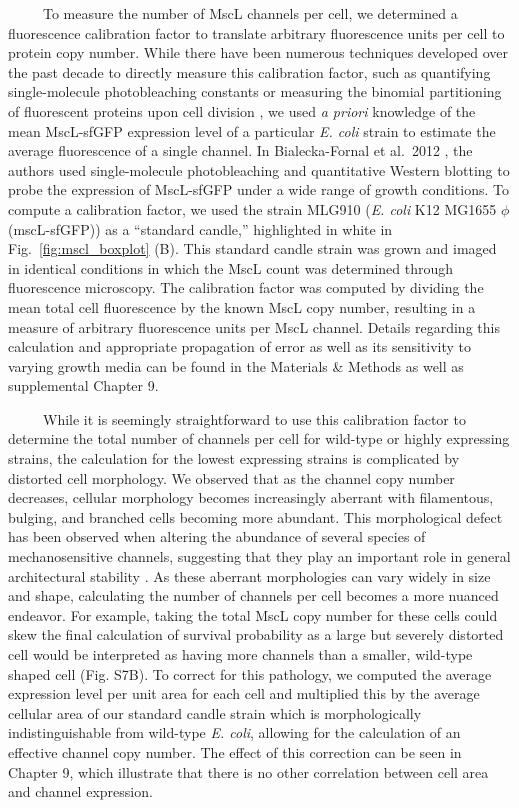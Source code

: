 \documentclass[12pt]{caltech_thesis}
\begin{document}
~~~~~To measure the number of MscL channels per cell, we determined a
fluorescence calibration factor to translate arbitrary fluorescence
units per cell to protein copy number. While there have been numerous
techniques developed over the past decade to directly measure this
calibration factor, such as quantifying single-molecule photobleaching
constants or measuring the binomial partitioning of fluorescent proteins
upon cell division \autocite{bialecka-fornal2012,elowitz2002}, we used
\emph{a priori} knowledge of the mean MscL-sfGFP expression level of a
particular \emph{E. coli} strain to estimate the average fluorescence of
a single channel. In Bialecka-Fornal et al.~2012
\autocite{bialecka-fornal2012}, the authors used single-molecule
photobleaching and quantitative Western blotting to probe the expression
of MscL-sfGFP under a wide range of growth conditions. To compute a
calibration factor, we used the strain MLG910 (\emph{E. coli} K12 MG1655
\(\phi\)(mscL-sfGFP)) as a ``standard candle,'' highlighted in white in
Fig.~\ref{fig:mscl_boxplot} (B). This standard candle strain was grown
and imaged in identical conditions in which the MscL count was
determined through fluorescence microscopy. The calibration factor was
computed by dividing the mean total cell fluorescence by the known MscL
copy number, resulting in a measure of arbitrary fluorescence units per
MscL channel. Details regarding this calculation and appropriate
propagation of error as well as its sensitivity to varying growth media
can be found in the Materials \& Methods as well as supplemental Chapter
9.

~~~~~While it is seemingly straightforward to use this calibration
factor to determine the total number of channels per cell for wild-type
or highly expressing strains, the calculation for the lowest expressing
strains is complicated by distorted cell morphology. We observed that as
the channel copy number decreases, cellular morphology becomes
increasingly aberrant with filamentous, bulging, and branched cells
becoming more abundant. This morphological defect has been observed when
altering the abundance of several species of mechanosensitive channels,
suggesting that they play an important role in general architectural
stability \autocite{bialecka-fornal2012,bialecka-fornal2015}. As these
aberrant morphologies can vary widely in size and shape, calculating the
number of channels per cell becomes a more nuanced endeavor. For
example, taking the total MscL copy number for these cells could skew
the final calculation of survival probability as a large but severely
distorted cell would be interpreted as having more channels than a
smaller, wild-type shaped cell (Fig. S7B). To correct for this
pathology, we computed the average expression level per unit area for
each cell and multiplied this by the average cellular area of our
standard candle strain which is morphologically indistinguishable from
wild-type \emph{E. coli}, allowing for the calculation of an effective
channel copy number. The effect of this correction can be seen in
Chapter 9, which illustrate that there is no other correlation between
cell area and channel expression.
\end{document}
